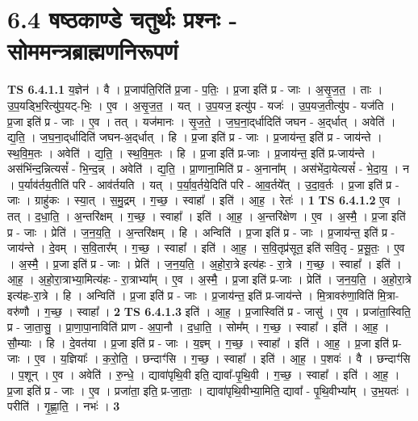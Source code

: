 \documentclass[17pt]{extarticle}
\begin{document}
\section*{ 6.4       षष्ठकाण्डे चतुर्थः प्रश्नः - सोममन्त्रब्राह्मणनिरूपणं }
                                \textbf{ TS 6.4.1.1} \newline
                  य॒ज्ञेन॑ । वै । प्र॒जाप॑ति॒रिति॑ प्र॒जा - प॒तिः॒ । प्र॒जा इति॑ प्र - जाः । अ॒सृ॒ज॒त॒ । ताः । उ॒प॒यड्भि॒रित्यु॑प॒यट्-भिः॒ । ए॒व । अ॒सृ॒ज॒त॒ । यत् । उ॒प॒यज॒ इत्यु॑प - यजः॑ । उ॒प॒यज॒तीत्यु॑प - यज॑ति । प्र॒जा इति॑ प्र - जाः । ए॒व । तत् । यज॑मानः । सृ॒ज॒ते॒ । ज॒घ॒ना॒द्‌र्धादिति॑ जघन - अ॒द्‌र्धात् । अवेति॑ । द्य॒ति॒ । ज॒घ॒ना॒द्‌र्धादिति॑ जघन-अ॒द्‌र्धात् । हि । प्र॒जा इति॑ प्र - जाः । प्र॒जाय॑न्त॒ इति॑ प्र - जाय॑न्ते । स्थ॒वि॒म॒तः । अवेति॑ । द्य॒ति॒ । स्थ॒वि॒म॒तः । हि । प्र॒जा इति॑ प्र-जाः । प्र॒जाय॑न्त॒ इति॑ प्र-जाय॑न्ते । अस॑भिंन्द॒न्नित्यसं᳚ - भि॒न्द॒न्न् । अवेति॑ । द्य॒ति॒ । प्रा॒णाना॒मिति॑ प्र - अ॒नाना᳚म् । अस॑भेंदा॒येत्यसं᳚ - भे॒दा॒य॒ । न । प॒र्याव॑र्तय॒तीति॑ परि - आव॑र्तयति । यत् । प॒र्या॒व॒र्तये॒दिति॑ परि - आ॒व॒र्तये᳚त् । उ॒दा॒व॒र्तः । प्र॒जा इति॑ प्र - जाः । ग्राहु॑कः । स्या॒त् । स॒मु॒द्रम् । ग॒च्छ॒ । स्वाहा᳚ । इति॑ । आ॒ह॒ । रेतः॑ । \textbf{  1} \newline
                  \newline
                                \textbf{ TS 6.4.1.2} \newline
                  ए॒व । तत् । द॒धा॒ति॒ । अ॒न्तरि॑क्षम् । ग॒च्छ॒ । स्वाहा᳚ । इति॑ । आ॒ह॒ । अ॒न्तरि॑क्षेण । ए॒व । अ॒स्मै॒ । प्र॒जा इति॑ प्र - जाः । प्रेति॑ । ज॒न॒य॒ति॒ । अ॒न्तरि॑क्षम् । हि । अन्विति॑ । प्र॒जा इति॑ प्र - जाः । प्र॒जाय॑न्त॒ इति॑ प्र - जाय॑न्ते । दे॒वम् । स॒वि॒तार᳚म् । ग॒च्छ॒ । स्वाहा᳚ । इति॑ । आ॒ह॒ । स॒वि॒तृप्र॑सूत॒ इति॑ सवि॒तृ - प्र॒सू॒तः॒ । ए॒व । अ॒स्मै॒ । प्र॒जा इति॑ प्र - जाः । प्रेति॑ । ज॒न॒य॒ति॒ । अ॒हो॒रा॒त्रे इत्य॑हः - रा॒त्रे । ग॒च्छ॒ । स्वाहा᳚ । इति॑ । आ॒ह॒ । अ॒हो॒रा॒त्राभ्या॒मित्य॑हः - रा॒त्राभ्या᳚म् । ए॒व । अ॒स्मै॒ । प्र॒जा इति॑ प्र-जाः । प्रेति॑ । ज॒न॒य॒ति॒ । अ॒हो॒रा॒त्रे इत्य॑हः-रा॒त्रे । हि । अन्विति॑ । प्र॒जा इति॑ प्र - जाः । प्र॒जाय॑न्त॒ इति॑ प्र-जाय॑न्ते । मि॒त्रावरु॑णा॒विति॑ मि॒त्रा-वरु॑णौ । ग॒च्छ॒ । स्वाहा᳚ । \textbf{  2} \newline
                  \newline
                                \textbf{ TS 6.4.1.3} \newline
                  इति॑ । आ॒ह॒ । प्र॒जास्विति॑ प्र - जासु॑ । ए॒व । प्रजा॑ता॒स्विति॒ प्र - जा॒ता॒सु॒ । प्रा॒णा॒पा॒नाविति॑ प्राण - अ॒पा॒नौ । द॒धा॒ति॒ । सोम᳚म् । ग॒च्छ॒ । स्वाहा᳚ । इति॑ । आ॒ह॒ । सौ॒म्याः । हि । दे॒वत॑या । प्र॒जा इति॑ प्र - जाः । य॒ज्ञ्म् । ग॒च्छ॒ । स्वाहा᳚ । इति॑ । आ॒ह॒ । प्र॒जा इति॑ प्र-जाः । ए॒व । य॒ज्ञियाः᳚ । क॒रो॒ति॒ । छन्दाꣳ॑सि । ग॒च्छ॒ । स्वाहा᳚ । इति॑ । आ॒ह॒ । प॒शवः॑ । वै । छन्दाꣳ॑सि । प॒शून् । ए॒व । अवेति॑ । रु॒न्धे॒ । द्यावा॑पृथि॒वी इति॒ द्यावा᳚-पृ॒थि॒वी । ग॒च्छ॒ । स्वाहा᳚ । इति॑ । आ॒ह॒ । प्र॒जा इति॑ प्र - जाः । ए॒व । प्रजा॑ता॒ इति॒ प्र-जा॒ताः॒ । द्यावा॑पृथि॒वीभ्या॒मिति॒ द्यावा᳚ - पृ॒थि॒वीभ्या᳚म् । उ॒भ॒यतः॑ । परीति॑ । गृ॒ह्णा॒ति॒ । नभः॑ । \textbf{  3} \newline
\end{document}
